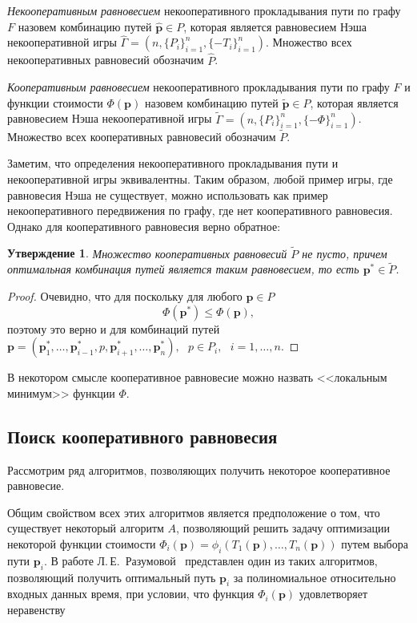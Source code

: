 \documentclass[12pt, a4paper]{article}
\newtheorem{state}{Утверждение}[section]
\begin{document}
\textit{Некооперативным равновесием} некооперативного прокладывания пути по графу $F$ назовем комбинацию путей $\widehat{\textbf{p}} \in P$, которая является равновесием Нэша некооперативной игры $\widehat{\Gamma} = (n, \{P_i\}_{i = 1}^n, \{-T_i\}_{i = 1}^n)$. Множество всех некооперативных равновесий обозначим $\widehat{P}$.

\textit{Кооперативным равновесием} некооперативного прокладывания пути по графу $F$ и функции стоимости $\Phi (\textbf{p})$ назовем комбинацию путей $\widetilde{\textbf{p}} \in P$, которая является равновесием Нэша некооперативной игры $\widetilde{\Gamma} = (n, \{P_i\}_{i = 1}^n, \{-\Phi\}_{i = 1}^n)$. Множество всех кооперативных равновесий обозначим $\widetilde{P}$.

Заметим, что определения некооперативного прокладывания пути и некооперативной игры эквивалентны.  
Таким образом, любой пример игры, где равновесия Нэша не существует, можно использовать как пример некооперативного передвижения по графу, где нет кооперативного равновесия.
Однако для кооперативного равновесия верно обратное:

\begin{state}
Множество кооперативных равновесий $\widetilde{P}$ не пусто, причем
оптимальная комбинация путей является таким равновесием, то есть $\textbf{p}^* \in \widetilde{P}$.
\end{state}

\begin{proof}
	Очевидно, что для поскольку для любого $\textbf{p} \in P$ 
	$$\Phi (\textbf{p}^*) \le \Phi (\textbf{p}),$$
	поэтому это верно и для комбинаций путей $\textbf{p} = \left(\textbf{p}^*_1, \ldots, \textbf{p}^*_{i - 1}, p, \textbf{p}^*_{i + 1}, \ldots, \textbf{p}^*_{n} \right), \text{ } p \in P_i, \text{ } i = 1, \ldots, n$.
\end{proof}

В некотором смысле кооперативное равновесие можно назвать <<локальным минимум>> функции $\Phi$.

\subsection{Поиск кооперативного равновесия}
Рассмотрим ряд алгоритмов, позволяющих получить некоторое кооперативное равновесие.

Общим свойством всех этих алгоритмов является предположение о том, что существует некоторый алгоритм $A$, позволяющий решить задачу оптимизации некоторой функции стоимости $\Phi_i (\textbf{p}) = \phi_i(T_1(\textbf{p}), \ldots, T_n(\textbf{p}))$ путем выбора пути $\textbf{p}_i$. В работе Л.\,Е.~Разумовой~\cite{Luba} представлен один из таких алгоритмов, позволяющий получить оптимальный путь $\textbf{p}_i$ за полиномиальное относительно входных данных время, при условии, что функция $\Phi_i (\textbf{p})$ удовлетворяет неравенству
\end{document}

